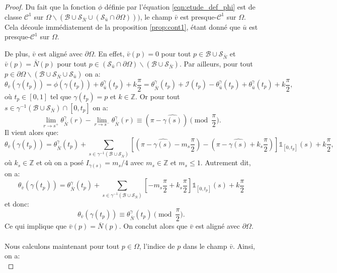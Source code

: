 \begin{proof}
    Du fait que la fonction $\phi$ définie par l'équation \eqref{eqn:etude_def_phi} est de classe $\mathcal{C}^1$ sur $\Omega\backslash(\mathcal{B}\cup\mathcal{S}_{\bar{N}}\cup(\mathcal{S}_{\bar{u}}\cap\partial\Omega)))$, le champ $\bar{v}$ est presque-$\mathcal{C}^1$ sur $\Omega$. Cela découle immédiatement de la proposition \ref{prop:cont1}, étant donné que $\bar{u}$ est presque-$\mathcal{C}^1$ sur $\Omega$.

    De plus, $\bar{v}$ est aligné avec $\partial\Omega$. En effet, $\bar{v}(p)=0$ pour tout $p\in\mathcal{B}\cup\mathcal{S}_{\bar{N}}$ et $\bar{v}(p)=\bar{N}(p)$ pour tout $p\in(\mathcal{S}_{\bar{u}}\cap\partial\Omega)\backslash(\mathcal{B}\cup\mathcal{S}_{\bar{N}})$. Par ailleurs, pour tout $p\in\partial\Omega\backslash(\mathcal{B}\cup\mathcal{S}_{\bar{N}}\cup\mathcal{S}_{\bar{u}})$ on a:
    $$\theta_{\bar{v}}(\gamma(t_p))=\phi(\gamma(t_p))+\theta_{\bar{u}}^\gamma(t_p)+k\frac{\pi}{2}=\theta_{\bar{N}}^\gamma(t_p)+\mathcal{I}(t_p)-\theta_{\bar{u}}^\gamma(t_p)+\theta_{\bar{u}}^\gamma(t_p)+k\frac{\pi}{2},$$
    où $t_p\in[0,1]$ tel que $\gamma(t_p)=p$ et $k\in\mathbb{Z}$. Or pour tout $s\in\gamma^{-1}(\mathcal{B}\cup\mathcal{S}_{\bar{N}})\cap[0, t_p]$ on a:
    $$
    \lim\limits_{r\rightarrow s^+}\theta^{\gamma}_{\bar{N}}(r) - \lim\limits_{r\rightarrow s^-}\theta^{\gamma}_{\bar{N}}(r)\equiv(\pi-\widehat{\gamma(s)})\pmod{\frac{\pi}{2}}.
    $$
    Il vient alors que:
    $$
    \theta_{\bar{v}}(\gamma(t_p))=\theta_{\bar{N}}^{\gamma}(t_p)+\displaystyle\sum_{s\in\gamma^{-1}(\mathcal{B}\cup\mathcal{S}_{\bar{N}})}\left[\left(\pi-\widehat{\gamma(s)}-m_s\frac{\pi}{2}\right)-\left(\pi-\widehat{\gamma(s)}+k_s\frac{\pi}{2}\right)\right]\mathbb{1}_{[0, t_p]}(s)+k\frac{\pi}{2},
    $$
    où $k_s\in\mathbb{Z}$ et où on a posé $I_{\gamma(s)}=m_s/4$ avec $m_s\in\mathbb{Z}$ et $m_s\leq1$. Autrement dit, on a:
    $$
    \theta_{\bar{v}}(\gamma(t_p))=\theta_{\bar{N}}^\gamma(t_p)+\displaystyle\sum_{s\in\gamma^{-1}(\mathcal{B}\cup\mathcal{S}_{\bar{N}})}\left[-m_s\frac{\pi}{2}+k_s\frac{\pi}{2}\right]\mathbb{1}_{[0, t_p]}(s)+k\frac{\pi}{2}$$
    et donc:
    $$
    \theta_{\bar{v}}(\gamma(t_p))\equiv\theta_{\bar{N}}^\gamma(t_p)\pmod{\frac{\pi}{2}}.
    $$
    Ce qui implique que $\bar{v}(p)=\bar{N}(p)$. On conclut alors que $\bar{v}$ est aligné avec $\partial\Omega$.\\\\
    Nous calculons maintenant pour tout $p\in\Omega$, l'indice de $p$ dans le champ $\bar{v}$. Ainsi, on a:\\

\end{proof}
